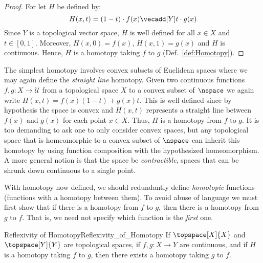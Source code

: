 \documentclass{article}                                                        %
\begin{document}
        \begin{proof}
            For let $H$ be defined by:
            \begin{equation}
                \label{eqn:Straight_Line_Homotopy}%
                H(x,t)=(1-t)\cdot{f}(x)\vecadd[Y]t\cdot{g}(x)
            \end{equation}
            Since $Y$ is a topological vector space, $H$ is well defined for all
            $x\in{X}$ and $t\in[0,1]$. Moreover, $H(x,0)=f(x)$, $H(x,1)=g(x)$
            and $H$ is continuous. Hence, $H$ is a homotopy taking $f$ to $g$
            (Def.~\ref{def:Homotopy}).
        \end{proof}
        \begin{example}
            \label{ex:Straight_Line_Homotopy_Euc_Spaces}%
            The simplest homotopy involves convex subsets of Euclidean spaces
            where we may again define the \textit{straight line} homotopy. Given
            two continuous functions $f,g:X\rightarrow\mathcal{U}$ from a
            topological space $X$ to a convex subset of $\nspace$ we again write
            $H(x,t)=f(x)(1-t)+g(x)t$. This is well defined since by hypothesis
            the space is convex and $H(x,t)$ represents a straight line between
            $f(x)$ and $g(x)$ for each point $x\in{X}$. Thus, $H$ is a homotopy
            from $f$ to $g$. It is too demanding to ask one to only consider
            convex spaces, but any topological space that is homeomorphic to a
            convex subset of $\nspace$ can inherit this homotopy by using
            function composition with the hypothesized homeomorphism. A more
            general notion is that the space be \textit{contractible}, spaces
            that can be shrunk down continuous to a single point.
        \end{example}
        With homotopy now defined, we should redundantly define
        \textit{homotopic} functions (functions with a homotopy between them).
        To avoid abuse of language we must first show that if there is a
        homotopy from $f$ to $g$, then there is a homotopy from $g$ to
        $f$. That is, we need not specify which function is the \textit{first}
        one.
        \begin{ltheorem}{Reflexivity of Homotopy}{Reflexivity_of_Homotopy}
            If $\topspace[X]{X}$ and $\topspace[Y]{Y}$ are topological spaces,
            if $f,g:X\rightarrow{Y}$ are continuous, and if $H$ is a homotopy
            taking $f$ to $g$, then there exists a homotopy taking $g$ to $f$.
        \end{ltheorem}
\end{document}
